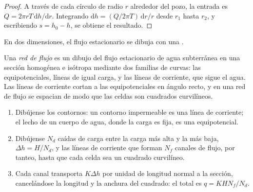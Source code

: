 \begin{proof}
A través de cada círculo de radio $r$ alrededor del pozo, la entrada es $Q = 2\pi r
T\,\mathrm dh/\mathrm dr$. Integrando $\mathrm dh = (Q/2\pi T)\,\mathrm
dr/r$ desde $r_1$ hasta $r_2$, y escribiendo $s = h_0 - h$, se obtiene el resultado.
\end{proof}

En dos dimensiones, el flujo estacionario se dibuja con una .

\begin{definition}\label{def:b3:hydrogeology:flow-net}
Una \emph{red de flujo} es un dibujo del flujo estacionario de agua subterránea en
una sección homogénea e isótropa mediante dos familias de curvas: las equipotenciales,
líneas de igual carga, y las líneas de corriente, que sigue el agua. Las
líneas de corriente cortan a las equipotenciales en ángulo recto, y en una red de flujo
se espacian de modo que las celdas son cuadrados curvilíneos.
\end{definition}

\begin{method}\label{met:b3:hydrogeology:flow-net}
\leavevmode
\begin{enumerate}
\item Dibújense los contornos: un contorno impermeable es una línea de corriente; el lecho de
  un cuerpo de agua, donde la carga es fija, es una equipotencial.
\item Dibújense $N_d$ caídas de carga entre la carga más alta y la más baja, $\Delta h
  = H/N_d$, y las líneas de corriente que forman $N_f$ canales de flujo, por tanteo,
  hasta que cada celda sea un cuadrado curvilíneo.
\item Cada canal transporta $K\Delta h$ por unidad de longitud normal a la
  sección, cancelándose la longitud y la anchura del cuadrado: el total es $q =
  KHN_f/N_d$.
\end{enumerate}
\end{method}

